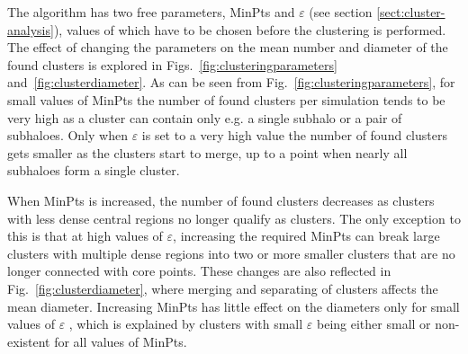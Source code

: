 \documentclass[english, twoside]{HYgradu}
\begin{document}

The algorithm has two free parameters, MinPts and $\varepsilon$ (see section \ref{sect:cluster-analysis}), values of which have to be chosen before the clustering is performed. The effect of changing the parameters on the mean number and diameter of the found clusters is explored in Figs.~\ref{fig:clusteringparameters} and~\ref{fig:clusterdiameter}. As can be seen from Fig.~\ref{fig:clusteringparameters}, for small values of MinPts the number of found clusters per simulation tends to be very high as a cluster can contain only e.g. a single subhalo or a pair of subhaloes. Only when $\varepsilon$ is set to a very high value the number of found clusters gets smaller as the clusters start to merge, up to a point when nearly all subhaloes form a single cluster.

When MinPts is increased, the number of found clusters decreases as clusters with less dense central regions no longer qualify as clusters. The only exception to this is that at high values of $\varepsilon$, increasing the required MinPts can break large clusters with multiple dense regions into two or more smaller clusters that are no longer connected with core points. These changes are also reflected in Fig.~\ref{fig:clusterdiameter}, where merging and separating of clusters affects the mean diameter. Increasing MinPts has little effect on the diameters only for small values of $\varepsilon$ , which is explained by clusters with small $\varepsilon$ being either small or non-existent for all values of MinPts.
\end{document}
